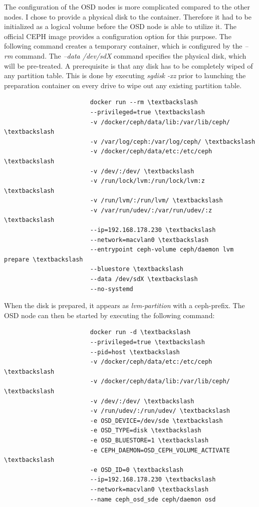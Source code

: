 \documentclass[titlepage, a4paper, 11pt]{scrartcl}
\begin{document}
                    The configuration of the OSD nodes is more complicated compared to the other nodes. I chose to provide a physical disk
                    to the container. Therefore it had to be initialized as a logical volume before the OSD node is able to utilize it.
                    The official CEPH image provides a configuration option for this purpose. The following command creates a temporary container,
                    which is configured by the \textit{--rm} command. The \textit{--data /dev/sdX} command specifies the physical disk, which will be 
                    pre-treated. A prerequisite is that any disk has to be completely wiped of any partition table. This is done by executing \textit{sgdisk -xz}
                    prior to launching the preparation container on every drive to wipe out any existing partition table.

                    \begin{lstlisting}
                        docker run --rm \textbackslash
                        --privileged=true \textbackslash
                        -v /docker/ceph/data/lib:/var/lib/ceph/ \textbackslash
                        -v /var/log/ceph:/var/log/ceph/ \textbackslash
                        -v /docker/ceph/data/etc:/etc/ceph \textbackslash
                        -v /dev/:/dev/ \textbackslash
                        -v /run/lock/lvm:/run/lock/lvm:z \textbackslash
                        -v /run/lvm/:/run/lvm/ \textbackslash
                        -v /var/run/udev/:/var/run/udev/:z \textbackslash
                        --ip=192.168.178.230 \textbackslash
                        --network=macvlan0 \textbackslash
                        --entrypoint ceph-volume ceph/daemon lvm prepare \textbackslash
                        --bluestore \textbackslash
                        --data /dev/sdX \textbackslash
                        --no-systemd                            
                    \end{lstlisting} 

                    When the disk is prepared, it appears as \textit{lvm-partition} with a ceph-prefix. The OSD node can then be started by executing the following command:

                    \begin{lstlisting}
                        docker run -d \textbackslash
                        --privileged=true \textbackslash
                        --pid=host \textbackslash
                        -v /docker/ceph/data/etc:/etc/ceph \textbackslash
                        -v /docker/ceph/data/lib:/var/lib/ceph/ \textbackslash
                        -v /dev/:/dev/ \textbackslash
                        -v /run/udev/:/run/udev/ \textbackslash
                        -e OSD_DEVICE=/dev/sde \textbackslash
                        -e OSD_TYPE=disk \textbackslash
                        -e OSD_BLUESTORE=1 \textbackslash
                        -e CEPH_DAEMON=OSD_CEPH_VOLUME_ACTIVATE \textbackslash
                        -e OSD_ID=0 \textbackslash
                        --ip=192.168.178.230 \textbackslash
                        --network=macvlan0 \textbackslash
                        --name ceph_osd_sde ceph/daemon osd
                    \end{lstlisting}
\end{document}
